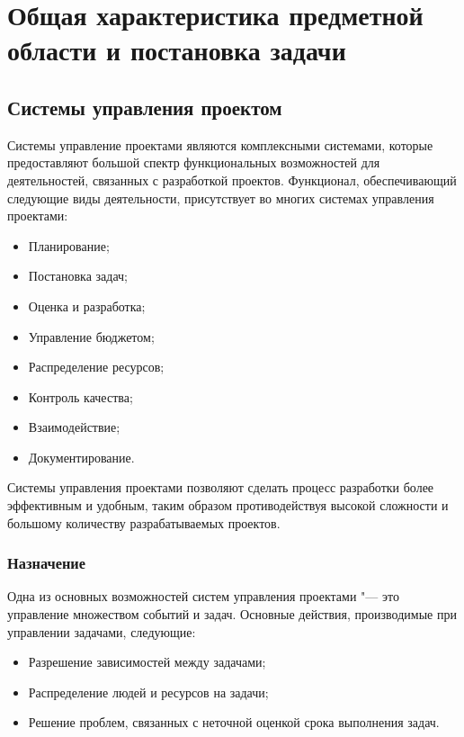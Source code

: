 \chapter{Общая характеристика предметной области и постановка задачи}
\section{Системы управления проектом}
Системы управление проектами являются комплексными системами, которые
предоставляют большой спектр функциональных возможностей для
деятельностей, связанных с разработкой проектов. Функционал, обеспечивающий
следующие виды деятельности, присутствует во многих системах управления
проектами:
\begin{itemize}
  \item Планирование;
  \item Постановка задач;
  \item Оценка и разработка;
  \item Управление бюджетом;
  \item Распределение ресурсов;
  \item Контроль качества;
  \item Взаимодействие;
  \item Документирование.
\end{itemize}
Системы управления проектами позволяют сделать процесс разработки более
эффективным и удобным, таким образом противодействуя высокой сложности и
большому количеству разрабатываемых проектов. 

\subsection{Назначение}

Одна из основных возможностей систем управления проектами "--- это
управление множеством событий и задач. Основные действия, производимые
при управлении задачами, следующие:
\begin{itemize}
  \item Разрешение зависимостей между задачами;
  \item Распределение людей и ресурсов на задачи;
  \item Решение проблем, связанных с неточной оценкой срока выполнения задач.
\end{itemize}

